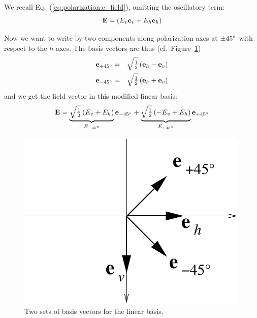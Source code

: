We recall Eq.~(\ref{eq:polarization:e_field}), omitting the
oscillatory term:
\begin{equation}
  \label{eq:polarization:E_linbase}
  \mathbf{E}= \left(E_v \mathbf{e}_v +  E_h \mathbf{e}_h \right) 
\end{equation}

Now we want to write  by two components along polarization axes at
$\pm 45^\circ$ with respect to the $h$-axes. The basis vectors are
thus (cf.\ Figure~\ref{fig:polarization:e45})
\begin{eqnarray}
  \label{eq:polarization:e_p45}
  \mathbf{e}_{+45^\circ} &=& \sqrt{\textstyle\frac{1}{2}} \left( \mathbf{e}_h - \mathbf{e}_v \right) \\
  \label{eq:polarization:e_m45}
  \mathbf{e}_{-45^\circ} &=& \sqrt{\textstyle\frac{1}{2}} \left( \mathbf{e}_h + \mathbf{e}_v \right) 
\end{eqnarray}
and we get the field vector in this modified linear basis:
\begin{equation}
  \label{eq:polarization:E_lin45base}
  \mathbf{E} = \underbrace{
               \sqrt{\textstyle\frac{1}{2}}\left(E_v +  E_h \right)}_{E_{-45^\circ}} 
               \mathbf{e}_{-45^\circ} 
              + \underbrace{
               \sqrt{\textstyle\frac{1}{2}}\left( -E_v +  E_h \right)}_{E_{+45^\circ}} 
               \mathbf{e}_{+45^\circ} 
\end{equation}
%
\begin{figure}[!ht]
 \begin{center}
  \begin{minipage}[c]{0.9\textwidth}
   \begin{center}
    \includegraphics*[width=0.4\hsize]{Figs/polarization/pol_e45}
   \end{center}
  \end{minipage}
  \begin{minipage}[c]{0.9\textwidth}
   \caption{Two sets of basis vectors for the linear basis.}
   \label{fig:polarization:e45}
  \end{minipage}
 \end{center}
\end{figure}   

